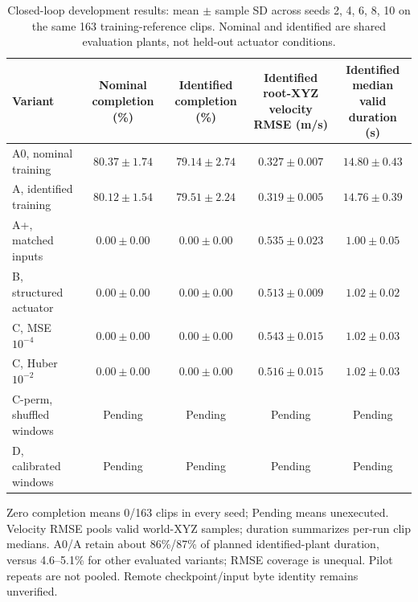 \documentclass[letterpaper,10pt,conference]{ieeeconf}
\newcommand{\tbd}{\textcolor{red!65!black}{Pending}}
\begin{document}
\begin{table}[t]
\centering
\caption{Closed-loop development results: mean $\pm$ sample SD across seeds 2, 4, 6, 8, 10 on the same 163 training-reference clips. Nominal and identified are shared evaluation plants, not held-out actuator conditions.}
\label{tab:outcomes}
\small
\begin{tabular}{@{}lcccc@{}}
\toprule
Variant & \shortstack{Nominal completion\\(\%)} & \shortstack{Identified completion\\(\%)} & \shortstack{Identified root-XYZ\\velocity RMSE (m/s)} & \shortstack{Identified median\\valid duration (s)} \\
\midrule
A0, nominal training & $80.37\pm1.74$ & $79.14\pm2.74$ & $0.327\pm0.007$ & $14.80\pm0.43$ \\
A, identified training & $80.12\pm1.54$ & $79.51\pm2.24$ & $0.319\pm0.005$ & $14.76\pm0.39$ \\
A+, matched inputs & $0.00\pm0.00$ & $0.00\pm0.00$ & $0.535\pm0.023$ & $1.00\pm0.05$ \\
B, structured actuator & $0.00\pm0.00$ & $0.00\pm0.00$ & $0.513\pm0.009$ & $1.02\pm0.02$ \\
C, MSE $10^{-4}$ & $0.00\pm0.00$ & $0.00\pm0.00$ & $0.543\pm0.015$ & $1.02\pm0.03$ \\
C, Huber $10^{-2}$ & $0.00\pm0.00$ & $0.00\pm0.00$ & $0.516\pm0.015$ & $1.02\pm0.03$ \\
C-perm, shuffled windows & \tbd & \tbd & \tbd & \tbd \\
D, calibrated windows & \tbd & \tbd & \tbd & \tbd \\
\bottomrule
\end{tabular}

\vspace{3pt}
\parbox{0.98\textwidth}{\footnotesize Zero completion means 0/163 clips in every seed; Pending means unexecuted. Velocity RMSE pools valid world-XYZ samples; duration summarizes per-run clip medians. A0/A retain about 86\%/87\% of planned identified-plant duration, versus 4.6--5.1\% for other evaluated variants; RMSE coverage is unequal. Pilot repeats are not pooled. Remote checkpoint/input byte identity remains unverified.}
\end{table}
\end{document}
